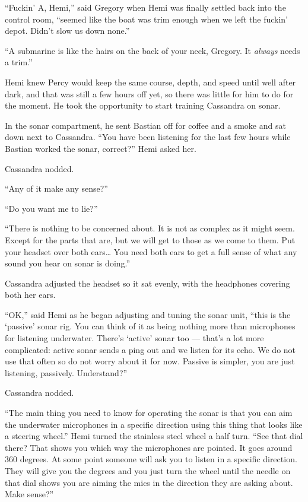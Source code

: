 \documentclass[
]{scrbook}
\begin{document}
``Fuckin' A, Hemi,'' said Gregory when Hemi was finally settled back
into the control room, ``seemed like the boat was trim enough when we
left the fuckin' depot. Didn't slow us down none.''

``A submarine is like the hairs on the back of your neck, Gregory. It
\emph{always} needs a trim.''

\bigskip

Hemi knew Percy would keep the same course, depth, and speed until well
after dark, and that was still a few hours off yet, so there was little
for him to do for the moment. He took the opportunity to start training
Cassandra on sonar.

In the sonar compartment, he sent Bastian off for coffee and a smoke and
sat down next to Cassandra. ``You have been listening for the last few
hours while Bastian worked the sonar, correct?'' Hemi asked her.

Cassandra nodded.

``Any of it make any sense?''

``Do you want me to lie?''

``There is nothing to be concerned about. It is not as complex as it
might seem. Except for the parts that are, but we will get to those as
we come to them. Put your headset over both ears\ldots{} You need both
ears to get a full sense of what any sound you hear on sonar is doing.''

Cassandra adjusted the headset so it sat evenly, with the headphones
covering both her ears.

``OK,'' said Hemi as he began adjusting and tuning the sonar unit,
``this is the `passive' sonar rig. You can think of it as being nothing
more than microphones for listening underwater. There's `active' sonar
too --- that's a lot more complicated: active sonar sends a ping out and
we listen for its echo. We do not use that often so do not worry about
it for now. Passive is simpler, you are just listening, passively.
Understand?''

Cassandra nodded.

``The main thing you need to know for operating the sonar is that you
can aim the underwater microphones in a specific direction using this
thing that looks like a steering wheel.'' Hemi turned the stainless
steel wheel a half turn. ``See that dial there? That shows you which way
the microphones are pointed. It goes around 360 degrees. At some point
someone will ask you to listen in a specific direction. They will give
you the degrees and you just turn the wheel until the needle on that
dial shows you are aiming the mics in the direction they are asking
about. Make sense?''
\end{document}
